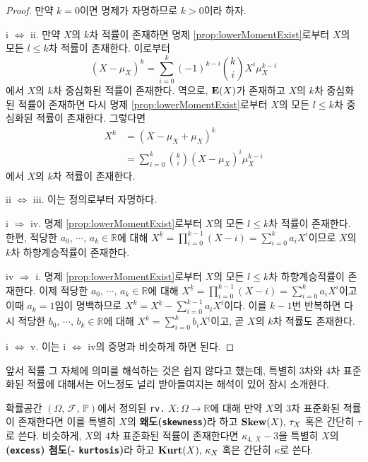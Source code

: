 \begin{proof}
    만약 $k=0$이면 명제가 자명하므로 $k>0$이라 하자.

    i $\Leftrightarrow$ ii. 만약 $X$의 $k$차 적률이 존재하면 명제 \ref{prop:lowerMomentExist}로부터 $X$의 모든 $l\leq k$차 적률이 존재한다. 이로부터
    \begin{equation*}
        (X-\mu_X)^k=\sum_{i=0}^k(-1)^{k-i}\binom{k}{i}X^i\mu_X^{k-i}
    \end{equation*}
    에서 $X$의 $k$차 중심화된 적률이 존재한다. 역으로, $\mathbf{E}(X)$가 존재하고 $X$의 $k$차 중심화된 적률이 존재하면 다시 명제 \ref{prop:lowerMomentExist}로부터 $X$의 모든 $l\leq k$차 중심화된 적률이 존재한다. 그렇다면
    \begin{align*}
        X^k&=(X-\mu_X+\mu_X)^k\\
        &=\sum_{i=0}^k\binom{k}{i}(X-\mu_X)^i\mu_X^{k-i}
    \end{align*}
    에서 $X$의 $k$차 적률이 존재한다.

    ii $\Leftrightarrow$ iii. 이는 정의로부터 자명하다.

    i $\Rightarrow$ iv. 명제 \ref{prop:lowerMomentExist}로부터 $X$의 모든 $l\leq k$차 적률이 존재한다. 한편, 적당한 $a_0,\,\cdots,\,a_k\in\mathbb{R}$에 대해 $X^{\underline{k}}=\prod_{i=0}^{k-1}(X-i)=\sum_{i=0}^ka_iX^i$이므로 $X$의 $k$차 하향계승적률이 존재한다.

    iv $\Rightarrow$ i. 명제 \ref{prop:lowerMomentExist}로부터 $X$의 모든 $l\leq k$차 하향계승적률이 존재한다. 이제 적당한 $a_0,\,\cdots,\,a_k\in\mathbb{R}$에 대해 $X^{\underline{k}}=\prod_{i=0}^{k-1}(X-i)=\sum_{i=0}^ka_iX^i$이고 이때 $a_k=1$임이 명백하므로 $X^k=X^{\underline{k}}-\sum_{i=0}^{k-1}a_iX^i$이다. 이를 $k-1$번 반복하면 다시 적당한 $b_0,\,\cdots,\,b_k\in\mathbb{R}$에 대해 $X^k=\sum_{i=0}^kb_iX^{\underline{i}}$이고, 곧 $X$의 $k$차 적률도 존재한다.

    i $\Leftrightarrow$ v. 이는 i $\Leftrightarrow$ iv의 증명과 비슷하게 하면 된다.
\end{proof}

앞서 적률 그 자체에 의미를 해석하는 것은 쉽지 않다고 했는데, 특별히 $3$차와 $4$차 표준화된 적률에 대해서는 어느정도 널리 받아들여지는 해석이 있어 잠시 소개한다.

\begin{definition}
    확률공간 $(\Omega,\,\mathcal{F},\,\mathbb{P})$에서 정의된 \texttt{rv.} $X:\Omega\to\mathbb{R}$에 대해 만약 $X$의 $3$차 표준화된 적률이 존재한다면 이를 특별히 $X$의 \textbf{왜도(\texttt{skewness})}라 하고 $\mathbf{Skew}(X),\,\tau_X$ 혹은 간단히 $\tau$로 쓴다. 비슷하게, $X$의 $4$차 표준화된 적률이 존재한다면 $\kappa_{4,\,X}-3$을 특별히 $X$의 \textbf{(\texttt{excess}) 첨도(- \texttt{kurtosis})}라 하고 $\mathbf{Kurt}(X),\,\kappa_X$ 혹은 간단히 $\kappa$로 쓴다.
\end{definition}


